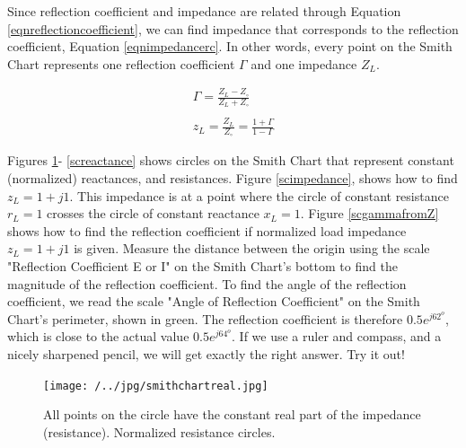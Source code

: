 \documentclass{ximera}
\begin{document}
Since reflection coefficient and impedance are related through Equation \ref{eqnreflectioncoefficient}, we can find impedance that corresponds to the reflection coefficient, Equation \ref{eqnimpedancerc}. In other words, every point on the Smith Chart represents one reflection coefficient $\Gamma$ and one impedance $Z_L$. 



\begin{eqnarray}
\Gamma = \frac{Z_L-Z_\circ}{Z_L+Z_\circ} \label{eqnreflectioncoefficient} \\ \nonumber \\
z_L = \frac{Z_L}{Z_\circ} = \frac{ 1+ \Gamma}{1- \Gamma } \label{eqnimpedancerc}
\end{eqnarray}

Figures \ref{scresistance}- \ref{screactance}  shows circles on the Smith Chart that represent constant (normalized) reactances, and resistances. Figure \ref{scimpedance}, shows how to find  $z_L=1+j 1$. This impedance is at a point where the circle of constant resistance $r_L=1$ crosses the circle of constant reactance $x_L=1$.   Figure \ref{scgammafromZ} shows how to find the reflection coefficient if normalized load impedance $z_L=1+j 1$ is given. Measure the distance between the origin using the scale "Reflection Coefficient E or I" on the Smith Chart's bottom to find the magnitude of the reflection coefficient. To find the angle of the reflection coefficient, we read the scale "Angle of Reflection Coefficient" on the Smith Chart's perimeter, shown in green. The reflection coefficient is therefore $0.5 e^{j 62^o}$, which is close to the actual value   $0.5 e^{j 64^o}$. If we use a ruler and compass, and a nicely sharpened pencil, we will get exactly the right answer. Try it out!

\begin{figure}[htbp]
\begin{center}
\texttt{[image: /../jpg/smithchartreal.jpg]}
\end{center}
\caption{All points on the circle have the constant real part of the impedance (resistance). Normalized resistance circles.}
\label{scresistance}
\end{figure}
\end{document}

